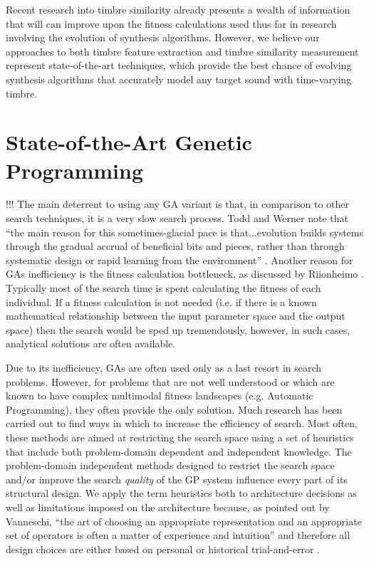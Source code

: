\documentclass[a4paper,12pt]{report} 	%
\numberwithin{figure}{chapter}
\numberwithin{table}{chapter}
\numberwithin{equation}{chapter}
\begin{document}
\begin{flushleft}
Recent research into timbre similarity already presents a wealth of information that will can improve upon the fitness calculations used thus far in research involving the evolution of synthesis algorithms. However, we believe our approaches to both timbre feature extraction and timbre similarity measurement represent state-of-the-art techniques, which provide the best chance of evolving synthesis algorithms that accurately model any target sound with time-varying timbre.

\section{State-of-the-Art Genetic Programming}
!!!
The main deterrent to using any GA variant is that, in comparison to other search techniques, it is a very slow search process. Todd and Werner note that ``the main reason for this sometimes-glacial pace is that...evolution builds systems through the gradual accrual of beneficial bits and pieces, rather than through systematic design or rapid learning from the environment'' \cite[p. 5]{Todd:1998t}. Another reason for GAs inefficiency is the fitness calculation bottleneck, as discussed by Riionheimo \cite[p.10]{Riionheimo:2003qo}. Typically most of the search time is spent calculating the fitness of each individual. If a fitness calculation is not needed (i.e. if there is a known mathematical relationship between the input parameter space and the output space) then the search would be sped up tremendously, however, in such cases, analytical solutions are often available.

Due to its inefficiency, GAs are often used only as a last resort in search problems. However, for problems that are not well understood or which are known to have complex multimodal fitness landscapes (e.g. Automatic Programming), they often provide the only solution. Much research has been carried out to find ways in which to increase the efficiency of search. Most often, these methods are aimed at restricting the search space using a set of heuristics that include both problem-domain dependent and independent knowledge. The problem-domain independent methods designed to restrict the search space and/or improve the search \emph{quality} of the GP system influence every part of its structural design. We apply the term heuristics both to architecture decisions as well as limitations imposed on the architecture because, as pointed out by Vanneschi, ``the art of choosing an appropriate representation and an appropriate set of operators is often a matter of experience and intuition'' and therefore all design choices are either based on personal or historical trial-and-error \cite[p. 6]{Vanneschi:2004le}.


\end{flushleft}
\end{document}
